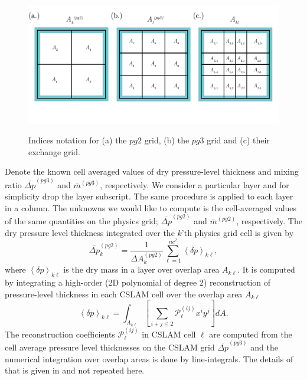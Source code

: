 \begin{figure}[t]
\begin{center}
\noindent\includegraphics[width=30pc,angle=0]{figs/area-schematic.png}\\
\end{center}
\caption{Indices notation for (a) the $pg2$ grid, (b) the $pg3$ grid and (c) their exchange grid.}
\label{fig:area-schematic}
\end{figure}

Denote the known cell averaged values of dry pressure-level thickness and mixing ratio $\overline{\Delta p}^{(pg3)}$ and $\overline{m}^{(pg3)}$, respectively. We consider a particular layer and for simplicity drop the layer subscript. The same procedure is applied to each layer in a column. The unknowns we would like to compute is the cell-averaged values of the same quantities on the physics grid; $\overline{\Delta p}^{(pg2)}$ and $\overline{m}^{(pg2)}$, respectively. The dry pressure level thickness integrated over the $k$'th physics grid cell is given by
\begin{equation}
\label{eq:p}
\overline{\Delta p}^{(pg2)}_k=\frac{1}{\Delta A^{(pg2)}_k}\sum_{\ell=1}^{nc^2}\left<\delta p\right>_{k\ell},
\end{equation}
where $\left< \delta p\right>_{k\ell}$ is the dry mass in a layer over overlap area $A_{k\ell}$. It is computed by integrating a high-order (2D polynomial of degree 2) reconstruction of pressure-level thickness in each CSLAM cell over the overlap area $A_{k\ell}$
\begin{equation}
\label{eq:pg3dp}
\left< \delta p\right>_{k\ell}=\int_{A_{k\ell}}\left[ \sum_{i+j\le 2}{\mathcal{P}}^{(ij)}_\ell x^{i}y^{j}\right] dA.
\end{equation}
The reconstruction coefficients ${\mathcal{P}}^{(ij)}_\ell$ in CSLAM cell $\ell$ are computed from the cell average pressure level thicknesses on the CSLAM grid $\overline{\Delta p}^{(pg3)}$ and the numerical integration over overlap areas is done by line-integrals. The details of that is given in \cite{LNU2010JCP} and not repeated here.

